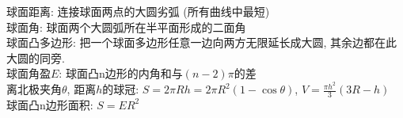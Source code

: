 \noindent
球面距离: 连接球面两点的大圆劣弧 (所有曲线中最短)\\
球面角: 球面两个大圆弧所在半平面形成的二面角\\
球面凸多边形: 把一个球面多边形任意一边向两方无限延长成大圆, 其余边都在此大圆的同旁.\\
球面角盈$E$: 球面凸n边形的内角和与$(n-2)\pi$的差\\
离北极夹角$\theta$, 距离$h$的球冠: $S=2\pi Rh=2\pi R^2(1-\cos\theta)$, $V=\frac{\pi h^2}{3}(3R-h)$\\
球面凸n边形面积: $S=ER^2$\\